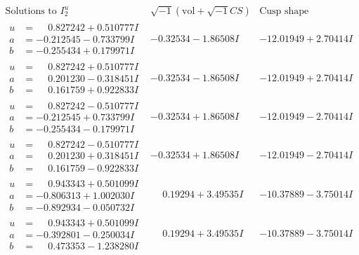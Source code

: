 \documentclass[1p]{elsarticle_modified}
\theoremstyle{definition}
\newcommand{\I}{\sqrt{-1}}
\begin{document}
$$\begin{array}{c|c|c}  
\text{Solutions to }I^u_{2}& \I (\text{vol} + \sqrt{-1}CS) & \text{Cusp shape}\\
 \hline 
\begin{aligned}
u &= \phantom{-}0.827242 + 0.510777 I \\
a &= -0.212545 - 0.733799 I \\
b &= -0.255434 + 0.179971 I\end{aligned}
 & -0.32534 - 1.86508 I & -12.01949 + 2.70414 I \\ \hline\begin{aligned}
u &= \phantom{-}0.827242 + 0.510777 I \\
a &= \phantom{-}0.201230 - 0.318451 I \\
b &= \phantom{-}0.161759 + 0.922833 I\end{aligned}
 & -0.32534 - 1.86508 I & -12.01949 + 2.70414 I \\ \hline\begin{aligned}
u &= \phantom{-}0.827242 - 0.510777 I \\
a &= -0.212545 + 0.733799 I \\
b &= -0.255434 - 0.179971 I\end{aligned}
 & -0.32534 + 1.86508 I & -12.01949 - 2.70414 I \\ \hline\begin{aligned}
u &= \phantom{-}0.827242 - 0.510777 I \\
a &= \phantom{-}0.201230 + 0.318451 I \\
b &= \phantom{-}0.161759 - 0.922833 I\end{aligned}
 & -0.32534 + 1.86508 I & -12.01949 - 2.70414 I \\ \hline\begin{aligned}
u &= \phantom{-}0.943343 + 0.501099 I \\
a &= -0.806313 + 1.002030 I \\
b &= -0.892934 - 0.050732 I\end{aligned}
 & \phantom{-}0.19294 + 3.49535 I & -10.37889 - 3.75014 I \\ \hline\begin{aligned}
u &= \phantom{-}0.943343 + 0.501099 I \\
a &= -0.392801 - 0.250034 I \\
b &= \phantom{-}0.473353 - 1.238280 I\end{aligned}
 & \phantom{-}0.19294 + 3.49535 I & -10.37889 - 3.75014 I \\ \hline\begin{aligned}

\end{aligned}
\end{array}$$
\end{document}
